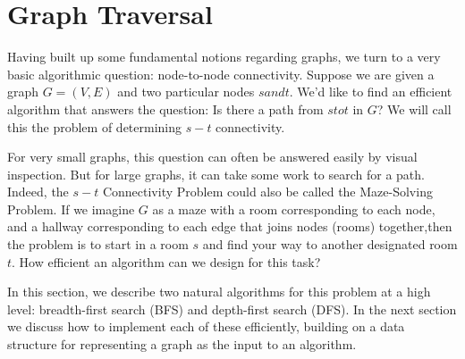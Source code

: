 \documentclass[12pt,a4paper]{book}
\begin{document}
\section{Graph Traversal}
Having built up some fundamental notions regarding graphs, we turn to a very basic algorithmic question: node-to-node connectivity. Suppose we are given a graph $G = (V, E)$ and two particular nodes $s and t$. We'd like to find an efficient algorithm that answers the question: Is there a path from $s to t$ in $G$? We will call this the problem of determining $s-t$ connectivity.\par 
For very small graphs, this question can often be answered easily by visual inspection. But for large graphs, it can take some work to search for a path. Indeed, the $s-t$ Connectivity Problem could also be called the Maze-Solving Problem. If we imagine $G$ as a maze with a room corresponding to each node, and a hallway corresponding to each edge that joins nodes (rooms) together,then the problem is to start in a room $s$ and find your way to another designated room $t$. How efficient an algorithm can we design for this task?\par
In this section, we describe two natural algorithms for this problem at a high level: breadth-first search (BFS) and depth-first search (DFS). In the next section we discuss how to implement each of these efficiently, building on a data structure for representing a graph as the input to an algorithm.
\end{document}
